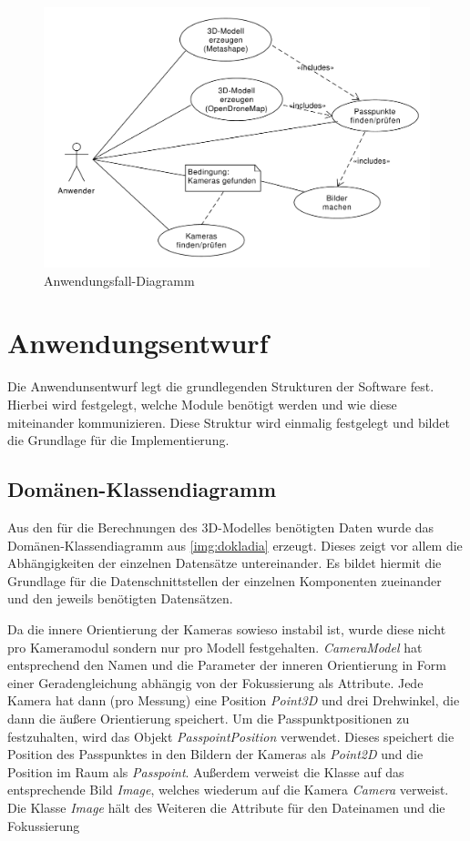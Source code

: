 \documentclass[./00PhotoBox.tex]{subfiles}
\begin{document}
\begin{figure}
  \centering
  \includegraphics[width=1\textwidth]{./img/uml/uml_usecases.pdf}
  \caption{Anwendungsfall-Diagramm} %
  \label{img:anwendungsfall} %
\end{figure}


\section{Anwendungsentwurf}
Die Anwendunsentwurf legt die grundlegenden Strukturen der Software fest. Hierbei wird festgelegt, welche Module benötigt werden und wie diese miteinander kommunizieren. Diese Struktur wird einmalig festgelegt und bildet die Grundlage für die Implementierung.

\subsection{Domänen-Klassendiagramm}
Aus den für die Berechnungen des 3D-Modelles benötigten Daten wurde das Domänen-Klassendiagramm aus \autoref{img:dokladia} erzeugt. Dieses zeigt vor allem die Abhängigkeiten der einzelnen Datensätze untereinander. Es bildet hiermit die Grundlage für die Datenschnittstellen der einzelnen Komponenten zueinander und den jeweils benötigten Datensätzen.

Da die innere Orientierung der Kameras sowieso instabil ist, wurde diese nicht pro Kameramodul sondern nur pro Modell festgehalten. \textit{CameraModel} hat entsprechend den Namen und die Parameter der inneren Orientierung in Form einer Geradengleichung abhängig von der Fokussierung als Attribute. Jede Kamera hat dann (pro Messung) eine Position  \textit{Point3D} und drei Drehwinkel, die dann die äußere Orientierung speichert. Um die Passpunktpositionen zu festzuhalten, wird das Objekt \textit{PasspointPosition} verwendet. Dieses speichert die Position des Passpunktes in den Bildern der Kameras als \textit{Point2D} und die Position im Raum als \textit{Passpoint}. Außerdem verweist die Klasse auf das entsprechende Bild \textit{Image}, welches wiederum auf die Kamera \textit{Camera} verweist. Die Klasse \textit{Image} hält des Weiteren die Attribute für den Dateinamen und die Fokussierung
\end{document}
